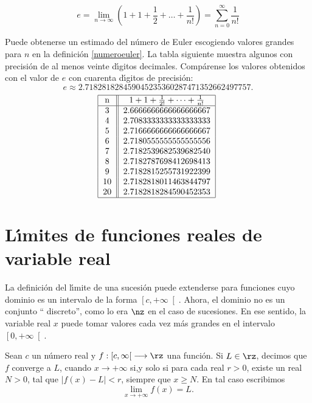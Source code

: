 \begin{definition}%
%
\label{numeroeuler}
\[
e=\lim_{n\rightarrow\infty}\left(  1+1+\frac{1}{2}+\dots+\frac{1}{n!}\right)
=\sum_{n=0}^{\infty}\frac{1}{n!}%
\]

\end{definition}

Puede obtenerse un estimado del n\'{u}mero de Euler escogiendo valores grandes
para $n$ en la definici\'{o}n \ref{numeroeuler}. La tabla siguiente muestra
algunos con precisi\'{o}n de al menos veinte d\'{\i}gitos decimales.
Comp\'{a}rense los valores obtenidos con el valor de $e$ con cuarenta
d\'{\i}gitos de precisi\'{o}n:
\[
e\approx2.718281828459045235360287471352662497757.
\]%
\[%
\begin{tabular}
[c]{|c||c|}\hline
n & $1+1+\frac{1}{2!}+\dots+\frac{1}{n!}$\\\hline
3 & 2.6666666666666666667\\
4 & 2.7083333333333333333\\
5 & 2.7166666666666666667\\
6 & 2.7180555555555555556\\
7 & 2.7182539682539682540\\
8 & 2.7182787698412698413\\
9 & 2.7182815255731922399\\
10 & 2.7182818011463844797\\
20 & 2.7182818284590452353\\\hline
\end{tabular}
\
\]


\section{L\'{\i}mites de funciones reales de varia\-ble real}

La definici\'{o}n del l\'{\i}mite de una sucesi\'{o}n puede extenderse para
funciones cuyo dominio es un intervalo de la forma $\left[  c,+\infty\right[
$. Ahora, el dominio no es un conjunto \textquotedblleft
discreto\textquotedblright, como lo era $\nz$ en el caso de sucesiones. En ese
sentido, la variable real $x$ puede tomar valores cada vez m\'{a}s grandes en
el intervalo $\left[  0,+\infty\right[  $.

\begin{definition}
Sean $c$ un n\'{u}mero real y $f:\left[  c,\infty\right[  \longrightarrow\rz$
una funci\'{o}n. Si $L\in\rz$, decimos que $f$ converge a $L$, cuando
$x\rightarrow+\infty$ si,y solo si para cada real $r>0$, existe un real $N>0$,
tal que $|f(x)-L|<r$, siempre que $x\geq N$. En tal caso escribimos%
\index{L\'{\i}mite!c@-- cuando $x\rightarrow+\infty$}
\[
\lim_{x\rightarrow+\infty}f(x)=L.
\]

\end{definition}

